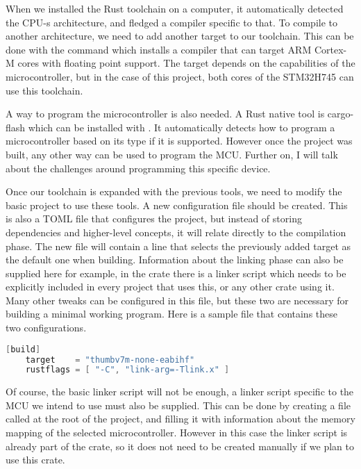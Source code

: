 When we installed the Rust toolchain on a computer, it automatically detected the CPU-s architecture, and fledged a compiler specific to that. To compile to another architecture, we need to add another target to our toolchain. This can be done with the command  which installs a compiler that can target ARM Cortex-M cores with floating point support. The target depends on the capabilities of the microcontroller, but in the case of this project, both cores of the STM32H745 can use this toolchain.

A way to program the microcontroller is also needed. A Rust native tool is cargo-flash which can be installed with . It automatically detects how to program a microcontroller based on its type if it is supported. However once the project was built, any other way can be used to program the MCU. Further on, I will talk about the challenges around programming this specific device.

Once our toolchain is expanded with the previous tools, we need to modify the basic project to use these tools. A new configuration file  should be created. This is also a TOML file that configures the project, but instead of storing dependencies and higher-level concepts, it will relate directly to the compilation phase. The new file will contain a line that selects the previously added target as the default one when building. Information about the linking phase can also be supplied here for example, in the  crate there is a linker script  which needs to be explicitly included in every project that uses this, or any other crate using it. Many other tweaks can be configured in this file, but these two are necessary for building a minimal working program. Here is a sample file that contains these two configurations.

\begin{lstlisting}[language=C,frame=single,float=!ht,label={lst:cargo-config-file},caption={Cargo Config File}]
    [build]
    target    = "thumbv7m-none-eabihf"
    rustflags = [ "-C", "link-arg=-Tlink.x" ]
\end{lstlisting}

Of course, the basic linker script will not be enough, a linker script specific to the MCU we intend to use must also be supplied. This can be done by creating a file called  at the root of the project, and filling it with information about the memory mapping of the selected microcontroller. However in this case the linker script is already part of the  crate, so it does not need to be created manually if we plan to use this crate.

